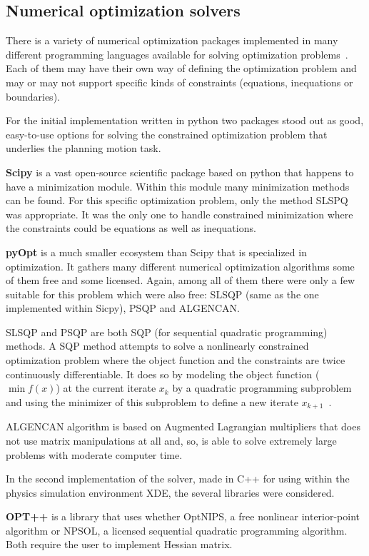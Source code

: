 \subsection{Numerical optimization solvers}


There is a variety of numerical optimization packages implemented in many different programming languages available for solving optimization problems~\cite{pyopt-paper}. Each of them may have their own way of defining the optimization problem and may or may not support specific kinds of constraints (equations, inequations or boundaries).

For the initial implementation written in python two packages stood out as good, easy-to-use options for solving the constrained optimization problem that underlies the planning motion task.

\textbf{Scipy} is a vast open-source scientific package based on python that happens to have a minimization module. Within this module many minimization methods can be found. For this specific optimization problem, only the method SLSPQ was appropriate. It was the only one to handle constrained minimization where the constraints could be equations as well as inequations.

\textbf{pyOpt} is a much smaller ecosystem than Scipy that is specialized in optimization. It gathers many different numerical optimization algorithms some of them free and some licensed. Again, among all of them there were only a few suitable for this problem which were also free: SLSQP (same as the one implemented within Sicpy), PSQP and ALGENCAN.

SLSQP and PSQP are both SQP (for sequential quadratic programming) methods. A SQP method attempts to solve a nonlinearly constrained optimization problem where the object function and the constraints are twice continuously differentiable. It does so by modeling the object function ($\min f(x)$) at the current iterate $x_k$ by a quadratic programming subproblem and using the minimizer of this subproblem to define a new iterate $x_{k+1}$~\cite{Nocedal}.

ALGENCAN algorithm is based on Augmented Lagrangian multipliers that does not use matrix manipulations at all and, so, is able to solve extremely large problems with moderate computer time.

In the second implementation of the solver, made in C++ for using within the physics simulation environment XDE, the several libraries were considered.

\textbf{OPT++} is a library that uses whether OptNIPS, a free nonlinear interior-point algorithm or NPSOL, a licensed sequential quadratic programming algorithm. Both require the user to implement Hessian matrix.

